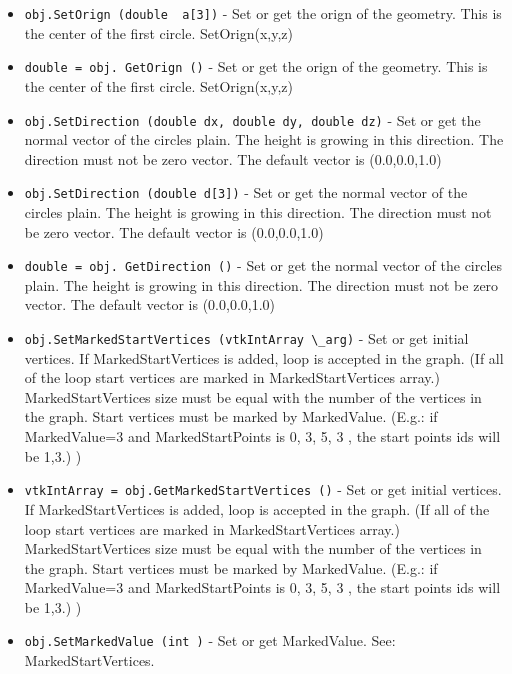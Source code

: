 \begin{itemize}
\item  \verb|obj.SetOrign (double  a[3])| -  Set or get the orign of the geometry. This is the center of the first circle. SetOrign(x,y,z)

\item  \verb|double = obj. GetOrign ()| -  Set or get the orign of the geometry. This is the center of the first circle. SetOrign(x,y,z)

\item  \verb|obj.SetDirection (double dx, double dy, double dz)| -  Set or get the normal vector of the circles plain. The height is growing in this direction. The direction must not be zero vector.
 The default vector is (0.0,0.0,1.0)

\item  \verb|obj.SetDirection (double d[3])| -  Set or get the normal vector of the circles plain. The height is growing in this direction. The direction must not be zero vector.
 The default vector is (0.0,0.0,1.0)

\item  \verb|double = obj. GetDirection ()| -  Set or get the normal vector of the circles plain. The height is growing in this direction. The direction must not be zero vector.
 The default vector is (0.0,0.0,1.0)

\item  \verb|obj.SetMarkedStartVertices (vtkIntArray \_arg)| -  Set or get initial vertices. If MarkedStartVertices is added, loop is accepted in the graph. (If all of the loop start vertices are
 marked in MarkedStartVertices array.) MarkedStartVertices size must be equal with the number of the vertices in the graph. Start
 vertices must be marked by MarkedValue. (E.g.: if MarkedValue=3 and MarkedStartPoints is { 0, 3, 5, 3 }, the start points ids will
 be {1,3}.) )

\item  \verb|vtkIntArray = obj.GetMarkedStartVertices ()| -  Set or get initial vertices. If MarkedStartVertices is added, loop is accepted in the graph. (If all of the loop start vertices are
 marked in MarkedStartVertices array.) MarkedStartVertices size must be equal with the number of the vertices in the graph. Start
 vertices must be marked by MarkedValue. (E.g.: if MarkedValue=3 and MarkedStartPoints is { 0, 3, 5, 3 }, the start points ids will
 be {1,3}.) )

\item  \verb|obj.SetMarkedValue (int )| -  Set or get MarkedValue. See: MarkedStartVertices.


\end{itemize}
